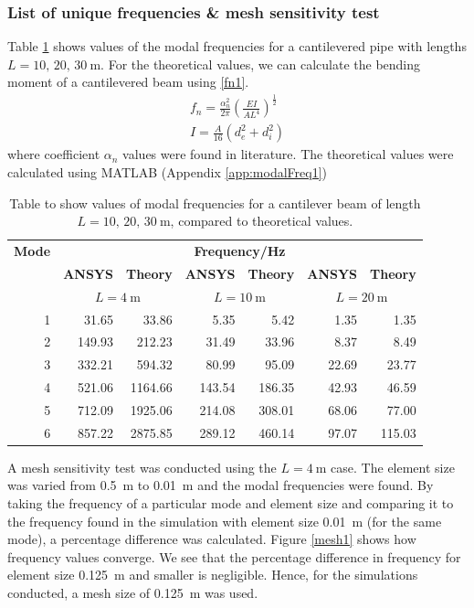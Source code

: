 \subsubsection{List of unique frequencies \& mesh sensitivity test}
Table \ref{modal1} shows values of the modal frequencies for a cantilevered pipe with lengths $L = 10,\,20,\,\SI{30}{\meter}$. For the theoretical values, we can calculate the bending moment of a cantilevered beam using \eqref{fn1}.
\begin{gather}
    f_n = \frac{\alpha_n^2}{2\pi}\left(\frac{EI}{AL^4}\right)^{\frac{1}{2}}\label{fn1}\\
    I = \frac{A}{16}\left(d^2_e + d^2_i\right)
\end{gather}
where coefficient $\alpha_n$ values were found in literature. The theoretical values were calculated using MATLAB (Appendix \ref{app:modalFreq1})
\begin{table}[H]
    \centering
    \begin{tabular}{@{}rrrrrrr@{}}
        \toprule
        \textbf{Mode} & \multicolumn{6}{c}{\textbf{Frequency/Hz}} \\
        & \textbf{ANSYS} & \textbf{Theory} & \textbf{ANSYS} & \textbf{Theory} & \textbf{ANSYS} & \textbf{Theory}\\
        & \multicolumn{2}{c}{$L = \SI{4}{\meter}$} & \multicolumn{2}{c}{$L = \SI{10}{\meter}$} & \multicolumn{2}{c}{$L = \SI{20}{\meter}$} \\
        \midrule
        1 & 31.65  & 33.86  & 5.35 & 5.42 & 1.35 & 1.35 \\
        2 & 149.93 & 212.23 & 31.49 & 33.96 & 8.37 & 8.49 \\
        3 & 332.21 & 594.32 & 80.99 & 95.09 & 22.69 & 23.77 \\
        4 & 521.06 & 1164.66 & 143.54 & 186.35 & 42.93 & 46.59 \\
        5 & 712.09 & 1925.06 & 214.08 & 308.01 & 68.06 & 77.00 \\
        6 & 857.22 & 2875.85 & 289.12 & 460.14 & 97.07 & 115.03 \\
        \bottomrule  
    \end{tabular}
    \caption{Table to show values of modal frequencies for a cantilever beam of length $L = 10,\,20,\,\SI{30}{\meter}$, compared to theoretical values.}
    \label{modal1}
\end{table}
A mesh sensitivity test was conducted using the $L=\SI{4}{\meter}$ case. The element size was varied from \SI{0.5}{\meter} to \SI{0.01}{\meter} and the modal frequencies were found. By taking the frequency of a particular mode and element size and comparing it to the frequency found in the simulation with element size \SI{0.01}{\meter} (for the same mode), a percentage difference was calculated. Figure \ref{mesh1} shows how frequency values converge. We see that the percentage difference in frequency for element size \SI{0.125}{\meter} and smaller is negligible. Hence, for the simulations conducted, a mesh size of \SI{0.125}{\meter} was used.
